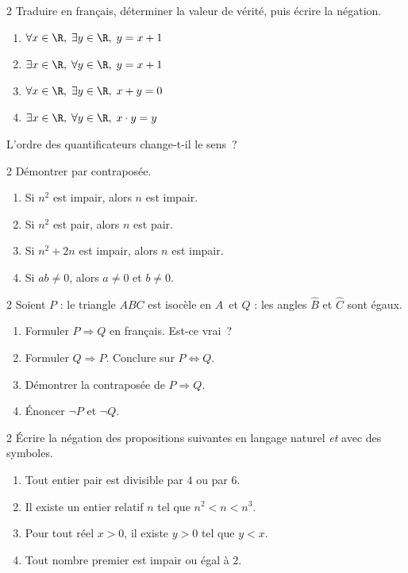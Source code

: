 \begin{exo}{2}
Traduire en fran\c cais, d\'eterminer la valeur de v\'erit\'e,
puis \'ecrire la n\'egation.
\begin{enumerate}
  \item $\forall x \in \R,\; \exists y \in \R,\; y = x + 1$
  \item $\exists x \in \R,\; \forall y \in \R,\; y = x + 1$
  \item $\forall x \in \R,\; \exists y \in \R,\; x + y = 0$
  \item $\exists x \in \R,\; \forall y \in \R,\; x \cdot y = y$
\end{enumerate}
L'ordre des quantificateurs change-t-il le sens~?
\end{exo}

\begin{exo}{2}
D\'emontrer par contrapos\'ee.
\begin{enumerate}
  \item Si $n^2$ est impair, alors $n$ est impair.
  \item Si $n^2$ est pair, alors $n$ est pair.
  \item Si $n^2 + 2n$ est impair, alors $n$ est impair.
  \item Si $ab \ne 0$, alors $a \ne 0$ et $b \ne 0$.
\end{enumerate}
\end{exo}

\begin{exo}{2}
Soient $P$ : \og le triangle $ABC$ est isoc\`ele en $A$\fg\ et
$Q$ : \og les angles $\hat B$ et $\hat C$ sont \'egaux\fg.
\begin{enumerate}
  \item Formuler $P \Rightarrow Q$ en fran\c cais. Est-ce vrai~?
  \item Formuler $Q \Rightarrow P$. Conclure sur $P \Leftrightarrow Q$.
  \item D\'emontrer la contrapos\'ee de $P \Rightarrow Q$.
  \item \'Enoncer $\lnot P$ et $\lnot Q$.
\end{enumerate}
\end{exo}

\begin{exo}{2}
\'Ecrire la n\'egation des propositions suivantes en langage naturel
\emph{et} avec des symboles.
\begin{enumerate}
  \item \og Tout entier pair est divisible par $4$ ou par $6$.\fg
  \item \og Il existe un entier relatif $n$ tel que $n^2 < n < n^3$.\fg
  \item \og Pour tout r\'eel $x > 0$, il existe $y > 0$ tel que $y < x$.\fg
  \item \og Tout nombre premier est impair ou \'egal \`a $2$.\fg
\end{enumerate}
\end{exo}

